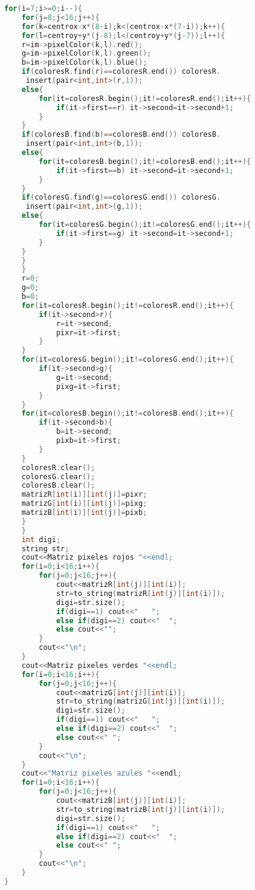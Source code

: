 \documentclass{article}
\begin{document}
\begin{lstlisting}[language=C++, label=Muestreo]
    for(i=7;i>=0;i--){
    for(j=8;j<16;j++){
    for(k=centrox-x*(8-i);k<(centrox-x*(7-i));k++){
    for(l=centroy+y*(j-8);l<(centroy+y*(j-7));l++){
    r=im->pixelColor(k,l).red();
    g=im->pixelColor(k,l).green();
    b=im->pixelColor(k,l).blue();
    if(coloresR.find(r)==coloresR.end()) coloresR.
     insert(pair<int,int>(r,1));
    else{
        for(it=coloresR.begin();it!=coloresR.end();it++){
            if(it->first==r) it->second=it->second+1;
        }
    }
    if(coloresB.find(b)==coloresB.end()) coloresB.
     insert(pair<int,int>(b,1));
    else{
        for(it=coloresB.begin();it!=coloresB.end();it++){
            if(it->first==b) it->second=it->second+1;
        }
    }
    if(coloresG.find(g)==coloresG.end()) coloresG.
     insert(pair<int,int>(g,1));
    else{
        for(it=coloresG.begin();it!=coloresG.end();it++){
            if(it->first==g) it->second=it->second+1;
        }
    }
    }
    }
    r=0;
    g=0;
    b=0;
    for(it=coloresR.begin();it!=coloresR.end();it++){
        if(it->second>r){
            r=it->second;
            pixr=it->first;
        }
    }
    for(it=coloresG.begin();it!=coloresG.end();it++){
        if(it->second>g){
            g=it->second;
            pixg=it->first;
        }
    }
    for(it=coloresB.begin();it!=coloresB.end();it++){
        if(it->second>b){
            b=it->second;
            pixb=it->first;
        }
    }
    coloresR.clear();
    coloresG.clear();
    coloresB.clear();
    matrizR[int(i)][int(j)]=pixr;
    matrizG[int(i)][int(j)]=pixg;
    matrizB[int(i)][int(j)]=pixb;
    }
    }
    int digi;
    string str;
    cout<<Matriz pixeles rojos "<<endl;
    for(i=0;i<16;i++){
        for(j=0;j<16;j++){
            cout<<matrizR[int(j)][int(i)];
            str=to_string(matrizR[int(j)][int(i)]);
            digi=str.size();
            if(digi==1) cout<<"   ";
            else if(digi==2) cout<<"  ";
            else cout<<"";
        }
        cout<<"\n";
    }
    cout<<Matriz pixeles verdes "<<endl;
    for(i=0;i<16;i++){
        for(j=0;j<16;j++){
            cout<<matrizG[int(j)][int(i)];
            str=to_string(matrizG[int(j)][int(i)]);
            digi=str.size();
            if(digi==1) cout<<"   ";
            else if(digi==2) cout<<"  ";
            else cout<<" ";
        }
        cout<<"\n";
    }
    cout<<"Matriz pixeles azules "<<endl;
    for(i=0;i<16;i++){
        for(j=0;j<16;j++){
            cout<<matrizB[int(j)][int(i)];
            str=to_string(matrizB[int(j)][int(i)]);
            digi=str.size();
            if(digi==1) cout<<"   ";
            else if(digi==2) cout<<"  ";
            else cout<<" ";
        }
        cout<<"\n";
    }
}

\end{lstlisting}
\end{document}
